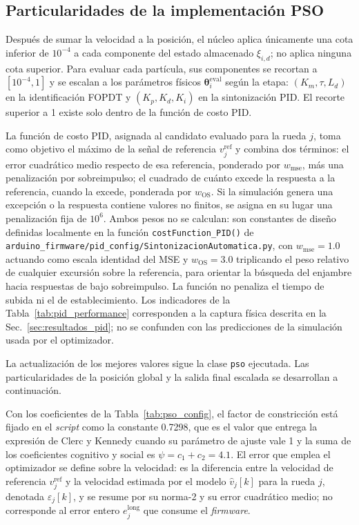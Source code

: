 \begin{appendices}
\subsection{Particularidades de la implementación PSO}
\label{anx:pso_detalle}

Después de sumar la velocidad a la posición, el núcleo aplica únicamente una cota inferior de $10^{-4}$ a cada componente del estado almacenado $\xi_{i,d}$; no aplica ninguna cota superior. Para evaluar cada partícula, sus componentes se recortan a $[10^{-4},1]$ y se escalan a los parámetros físicos $\boldsymbol{\theta}_i^{\mathrm{eval}}$ según la etapa: $(K_m,\tau,L_d)$ en la identificación FOPDT y $(K_p,K_d,K_i)$ en la sintonización PID. El recorte superior a 1 existe solo dentro de la función de costo PID.

La función de costo PID, asignada al candidato evaluado para la rueda $j$, toma como objetivo el máximo de la señal de referencia $v_j^{\mathrm{ref}}$ y combina dos términos: el error cuadrático medio respecto de esa referencia, ponderado por $w_{\mathrm{mse}}$, más una penalización por sobreimpulso; el cuadrado de cuánto excede la respuesta a la referencia, cuando la excede, ponderada por $w_{\mathrm{OS}}$. Si la simulación genera una excepción o la respuesta contiene valores no finitos, se asigna en su lugar una penalización fija de $10^{6}$. Ambos pesos no se calculan: son constantes de diseño definidas
localmente en la función \texttt{costFunction\_PID()} de
\texttt{arduino\_\allowbreak{}firmware/\allowbreak{}pid\_\allowbreak{}config/\allowbreak{}SintonizacionAutomatica.\allowbreak{}py}, con
$w_{\mathrm{mse}}=1.0$ actuando como escala identidad del MSE y
$w_{\mathrm{OS}}=3.0$ triplicando el peso relativo de cualquier excursión
sobre la referencia, para orientar la búsqueda del enjambre hacia respuestas
de bajo sobreimpulso. La función no penaliza el tiempo de subida ni el de
establecimiento. Los indicadores de la Tabla~\ref{tab:pid_performance}
corresponden a la captura física descrita en la
Sec.~\ref{sec:resultados_pid}; no se confunden con las predicciones de la
simulación usada por el optimizador.

La actualización de los mejores valores sigue la clase
\texttt{pso} ejecutada. Las particularidades de la posición global y la salida
final escalada se desarrollan a continuación.

Con los coeficientes de la Tabla~\ref{tab:pso_config}, el factor de constricción está fijado en el \textit{script} como la constante 0.7298, que es el valor que entrega la expresión de Clerc y Kennedy \citep[Ec.~5.3]{clerc2002particle} cuando su parámetro de ajuste vale 1 y la suma de los coeficientes cognitivo y social es $\psi=c_1+c_2=4.1$. El error que emplea el optimizador se define sobre la velocidad: es la diferencia entre la velocidad de referencia $v_j^{\mathrm{ref}}$ y la velocidad estimada por el modelo $\widehat{v}_j[k]$ para la rueda $j$, denotada $\varepsilon_j[k]$, y se resume por su norma-2 y su error cuadrático medio; no corresponde al error entero $e_j^{\mathrm{long}}$ que consume el \textit{firmware}.


\end{appendices}
